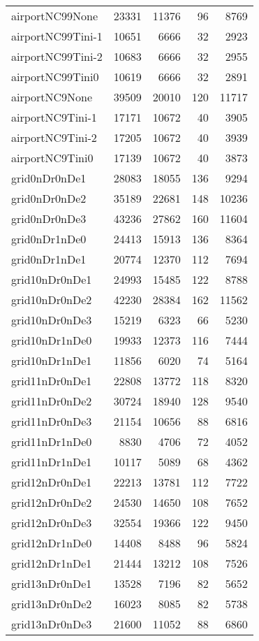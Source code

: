 \begin{longtable}{lrrrr}
airportNC99None & 23331 & 11376 & 96 & 8769 \\
airportNC99Tini-1 & 10651 & 6666 & 32 & 2923 \\
airportNC99Tini-2 & 10683 & 6666 & 32 & 2955 \\
airportNC99Tini0 & 10619 & 6666 & 32 & 2891 \\
airportNC9None & 39509 & 20010 & 120 & 11717 \\
airportNC9Tini-1 & 17171 & 10672 & 40 & 3905 \\
airportNC9Tini-2 & 17205 & 10672 & 40 & 3939 \\
airportNC9Tini0 & 17139 & 10672 & 40 & 3873 \\
grid0nDr0nDe1 & 28083 & 18055 & 136 & 9294 \\
grid0nDr0nDe2 & 35189 & 22681 & 148 & 10236 \\
grid0nDr0nDe3 & 43236 & 27862 & 160 & 11604 \\
grid0nDr1nDe0 & 24413 & 15913 & 136 & 8364 \\
grid0nDr1nDe1 & 20774 & 12370 & 112 & 7694 \\
grid10nDr0nDe1 & 24993 & 15485 & 122 & 8788 \\
grid10nDr0nDe2 & 42230 & 28384 & 162 & 11562 \\
grid10nDr0nDe3 & 15219 & 6323 & 66 & 5230 \\
grid10nDr1nDe0 & 19933 & 12373 & 116 & 7444 \\
grid10nDr1nDe1 & 11856 & 6020 & 74 & 5164 \\
grid11nDr0nDe1 & 22808 & 13772 & 118 & 8320 \\
grid11nDr0nDe2 & 30724 & 18940 & 128 & 9540 \\
grid11nDr0nDe3 & 21154 & 10656 & 88 & 6816 \\
grid11nDr1nDe0 & 8830 & 4706 & 72 & 4052 \\
grid11nDr1nDe1 & 10117 & 5089 & 68 & 4362 \\
grid12nDr0nDe1 & 22213 & 13781 & 112 & 7722 \\
grid12nDr0nDe2 & 24530 & 14650 & 108 & 7652 \\
grid12nDr0nDe3 & 32554 & 19366 & 122 & 9450 \\
grid12nDr1nDe0 & 14408 & 8488 & 96 & 5824 \\
grid12nDr1nDe1 & 21444 & 13212 & 108 & 7526 \\
grid13nDr0nDe1 & 13528 & 7196 & 82 & 5652 \\
grid13nDr0nDe2 & 16023 & 8085 & 82 & 5738 \\
grid13nDr0nDe3 & 21600 & 11052 & 88 & 6860 \\

\end{longtable}
